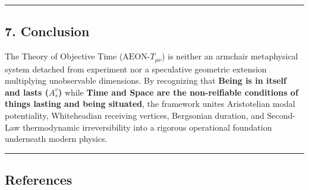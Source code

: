 \documentclass[
]{article}
\begin{document}
\begin{center}\rule{0.5\linewidth}{0.5pt}\end{center}

\subsection{7. Conclusion}\label{conclusion}

The Theory of Objective Time (\(\text{AEON-}T_{\mu\nu}\)) is neither an
armchair metaphysical system detached from experiment nor a speculative
geometric extension multiplying unobservable dimensions. By recognizing
that \textbf{Being is in itself and lasts (\(A_s^v\))} while
\textbf{Time and Space are the non-reifiable conditions of things
lasting and being situated}, the framework unites Aristotelian modal
potentiality, Whiteheadian receiving vertices, Bergsonian duration, and
Second-Law thermodynamic irreversibility into a rigorous operational
foundation underneath modern physics.

\begin{center}\rule{0.5\linewidth}{0.5pt}\end{center}

\subsection{References}\label{references}
\end{document}

